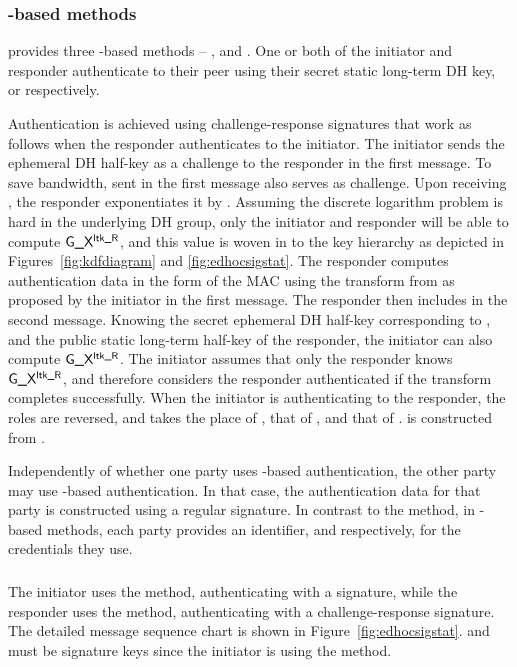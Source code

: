 \subsubsection{\mStat-based methods}
\mEdhoc{} provides three \mStat-based methods -- \mSigStat{}, \mStatStat{} and
\mStatSig{}.
%
One or both of the initiator and responder authenticate to their peer using
their secret static long-term DH key, \mLtki{} or \mLtkr{} respectively.
%

Authentication is achieved using challenge-response signatures that work as
follows when the responder authenticates to the initiator.
%
The initiator sends the ephemeral DH half-key \mGx{} as a challenge to the
responder in the first message.
%
To save bandwidth,  sent in the first message also serves as challenge.
%
Upon receiving \mGx{}, the responder exponentiates it by \mLtkr{}.
%
Assuming the discrete logarithm problem is hard in the underlying DH group,
only the initiator and responder will be able to compute $\textsf{G\_X}{}^{\textsf{ltk\_R}}{}$,
and this value is woven in to the key hierarchy as depicted in
Figures~\ref{fig:kdfdiagram} and \ref{fig:edhocsigstat}.
%
The responder computes authentication data \mAuthr{} in the form of the MAC
\mMactwo{} using the \mAead{} transform from \mSuites{} as proposed by the
initiator in the first message.
%
The responder then includes \mMactwo{} in the second message.
%
Knowing the secret ephemeral DH half-key corresponding to \mGx{}, and the public
static long-term half-key of the responder, the initiator can also
compute $\textsf{G\_X}{}^{\textsf{ltk\_R}}{}$.
%
The initiator assumes that only the responder knows $\textsf{G\_X}{}^{\textsf{ltk\_R}}{}$, and
therefore considers the responder authenticated if the \mAead{} transform
completes successfully.
%
When the initiator is authenticating to the responder, the roles are reversed,
and \mGy{} takes the place of \mGx{}, \mLtki{} that of \mLtkr{}, and \mAuthi{}
that of \mAuthr{}. \mAuthi{} is constructed from \mMacthree{}.
%

Independently of whether one party uses \mStat{}-based authentication, the
other party may use \mSig{}-based authentication.
%
In that case, the authentication data for that party is constructed
using a regular signature.
%
In contrast to the \mPskPsk{} method, in \mStat{}-based methods, each party
provides an identifier, \mIdcredi{} and \mIdcredr{} respectively, for the
credentials they use.
%

\spacehack
\subsubsection{\mSigStat}
The initiator uses the \mSig{} method, authenticating with a signature,
while the responder uses the \mStat{} method, authenticating with a
challenge-response signature.
%
The detailed message sequence chart is shown in Figure~\ref{fig:edhocsigstat}.
%
\mCredi{} and \mLtki{} must be signature keys since the initiator is using the
\mSig{} method.
%

